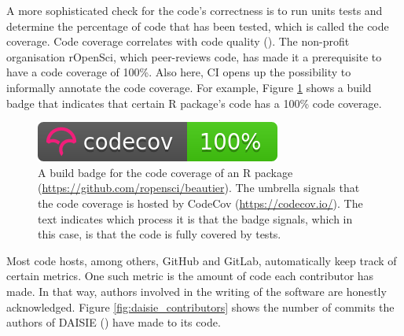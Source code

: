 A more sophisticated check for the code's correctness is
to run units tests and determine the percentage of code that has been
tested, which is called the code coverage. Code coverage
correlates with code quality (\cite{horgan1994,del1995correlation}). 
The non-profit organisation rOpenSci, which peer-reviews code,
has made it a prerequisite to have a code coverage of 100\%.
Also here, CI opens up the possibility to informally annotate the
code coverage. For example, Figure \ref{fig:badge_codecov} shows a 
build badge that indicates that certain R package's code 
has a 100\% code coverage.

\begin{figure}[!htbp]
  \centering
  \includegraphics[]{badge_codecov.png}
  \caption{
    A build badge for the code coverage of an R 
    package (\url{https://github.com/ropensci/beautier}).
    The umbrella signals that the code coverage is hosted by
    CodeCov (\url{https://codecov.io/}). 
    The text indicates which process it is that the badge
    signals, which in this case, is that the code is fully covered
    by tests.
  }
  \label{fig:badge_codecov}
\end{figure}


Most code hosts, among others, GitHub and GitLab,
automatically keep track of certain metrics.
One such metric is the amount of code each contributor has made.
In that way, authors involved in the writing of the software
are honestly acknowledged. Figure \ref{fig:daisie_contributors}
shows the number of commits the authors of DAISIE (\cite{etienne2020daisie})
have made to its code.

